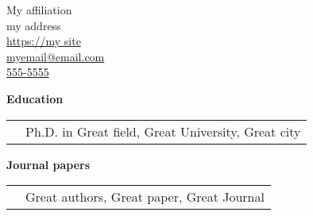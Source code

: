 \documentclass[10pt,letterpaper]{article}
\makeatletter
\newcommand{\itemTitle}[1]{\vspace{0.1 in}\begin{flushleft}\textbf{#1}\end{flushleft}}
\newcommand{\basicInfo}[2]{\begin{flushright}\small #1\\\small #2\end{flushright}}
\newcommand{\itemContents}[2]{\begin{tabularx}{\textwidth}{>{\quad}Xp{14cm}}#1&#2\end{tabularx}}
\newcommand{\affiliation}{My affiliation}
\newcommand{\contact}{my address\\
  \url{https://my site}\\
  \href{mailto:myemail@email.com}{myemail@email.com}\\
  \href{tel:5555555}{555-5555}
  }
\makeatother
\begin{document}
\basicInfo{\affiliation}{\contact}
\begin{center}\end{center}


\itemTitle{Education}
\itemContents{2017}{Ph.D. in Great field, Great University, Great city}

\itemTitle{Journal papers}
\itemContents{2017}{Great authors, Great paper, Great Journal}
\end{document}
